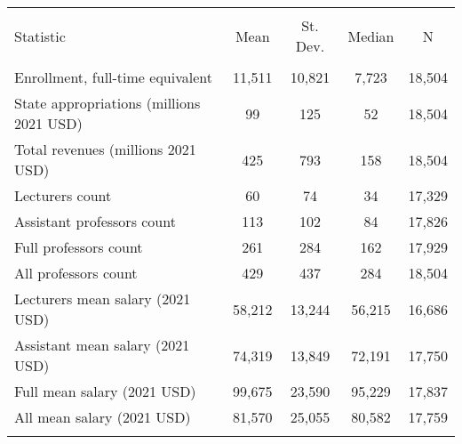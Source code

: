 
\begin{tabular}{@{\extracolsep{5pt}}lcccc} 
\\[-1.8ex]\hline 
\hline \\[-1.8ex] 
Statistic & \multicolumn{1}{c}{Mean} & \multicolumn{1}{c}{St. Dev.} & \multicolumn{1}{c}{Median} & \multicolumn{1}{c}{N} \\ 
\hline \\[-1.8ex] 
Enrollment, full-time equivalent & 11,511 & 10,821 & 7,723 & 18,504 \\ 
State appropriations (millions 2021 USD) & 99 & 125 & 52 & 18,504 \\ 
Total revenues (millions 2021 USD) & 425 & 793 & 158 & 18,504 \\ 
Lecturers count & 60 & 74 & 34 & 17,329 \\ 
Assistant professors count & 113 & 102 & 84 & 17,826 \\ 
Full professors count & 261 & 284 & 162 & 17,929 \\ 
All professors count & 429 & 437 & 284 & 18,504 \\ 
Lecturers mean salary (2021 USD) & 58,212 & 13,244 & 56,215 & 16,686 \\ 
Assistant mean salary (2021 USD) & 74,319 & 13,849 & 72,191 & 17,750 \\ 
Full mean salary (2021 USD) & 99,675 & 23,590 & 95,229 & 17,837 \\ 
All mean salary (2021 USD) & 81,570 & 25,055 & 80,582 & 17,759 \\ 
\hline \\[-1.8ex] 
\end{tabular} 
